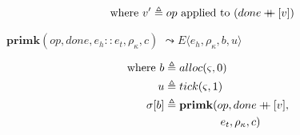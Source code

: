 \documentclass[12pt,draft]{article}
\newcommand\mdoubleplus{\ensuremath{\mathbin{+\mkern-9mu+}}}
\begin{document}
\begin{multicols*}{2}
\begin{align*}
\text{where } v' &\triangleq op \text{ applied to } (done \mdoubleplus [v])
\end{align*}
\begin{center}
  $\textbf{primk}(op, done, e_h::e_t, \rho_\kappa, c)$
  $\leadsto E\langle e_h , \rho_\kappa , b , u \rangle$
\end{center}
\vspace{-7mm}
\begin{align*}
\text{where } b &\triangleq alloc(\varsigma, 0) \\
u &\triangleq tick(\varsigma, 1) \\
\sigma[b] &\triangleq \textbf{primk}(op, done \mdoubleplus [v], \\
&\;\;\;\;\;\;\;\;\;\;\;\;\;\;\;\;\;\; e_t, \rho_{\kappa}, c)
\end{align*}
\end{multicols*}
\newpage

\end{document}
